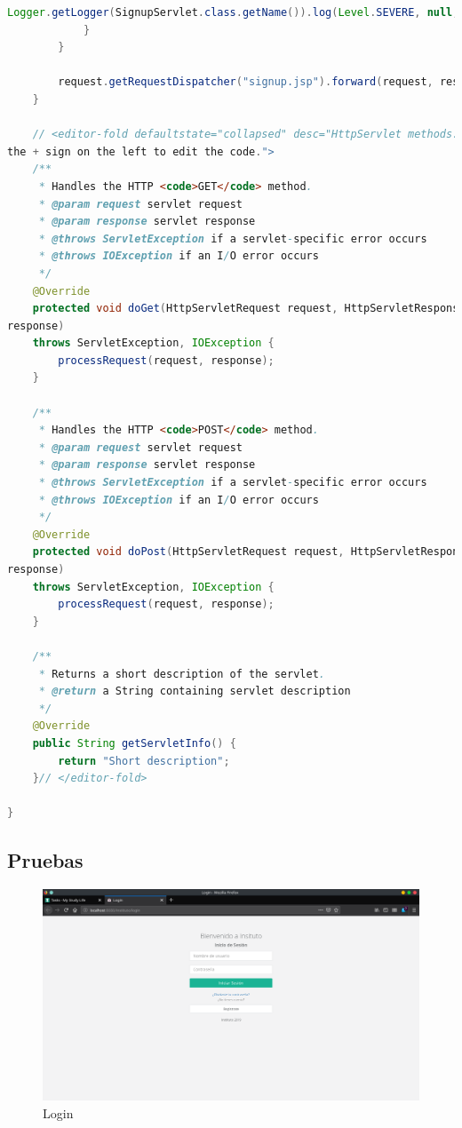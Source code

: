 \documentclass[a4paper,12pt]{article}
\begin{document}
\begin{lstlisting}[language=Java, style=customJava, 
caption={SignupServlet.java}, captionpos=b,basicstyle=\fontfamily{cmss}\small]
Logger.getLogger(SignupServlet.class.getName()).log(Level.SEVERE, null, ex);
            }
        }
            
        request.getRequestDispatcher("signup.jsp").forward(request, response);
    } 

    // <editor-fold defaultstate="collapsed" desc="HttpServlet methods. Click on 
the + sign on the left to edit the code.">
    /** 
     * Handles the HTTP <code>GET</code> method.
     * @param request servlet request
     * @param response servlet response
     * @throws ServletException if a servlet-specific error occurs
     * @throws IOException if an I/O error occurs
     */
    @Override
    protected void doGet(HttpServletRequest request, HttpServletResponse 
response)
    throws ServletException, IOException {
        processRequest(request, response);
    } 

    /** 
     * Handles the HTTP <code>POST</code> method.
     * @param request servlet request
     * @param response servlet response
     * @throws ServletException if a servlet-specific error occurs
     * @throws IOException if an I/O error occurs
     */
    @Override
    protected void doPost(HttpServletRequest request, HttpServletResponse 
response)
    throws ServletException, IOException {
        processRequest(request, response);
    }

    /** 
     * Returns a short description of the servlet.
     * @return a String containing servlet description
     */
    @Override
    public String getServletInfo() {
        return "Short description";
    }// </editor-fold>

}
\end{lstlisting}

\subsection{Pruebas}

\begin{figure}[H]
\begin{center}
 \includegraphics[width=\textwidth]{login.png}
 \caption{Login}
 \label{fig:login}
\end{center}
\end{figure}
\end{document}
